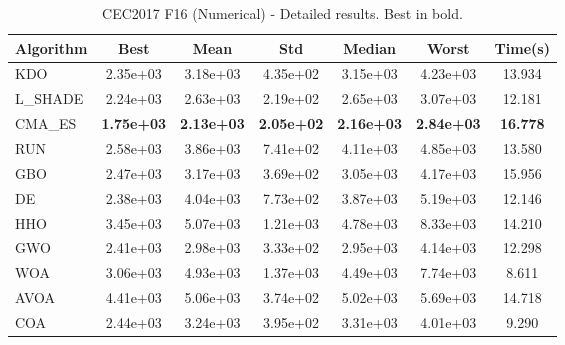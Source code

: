 \begin{table}[H]
\centering\small
\caption{CEC2017 F16 (Numerical) - Detailed results. Best in bold.}
\label{tab:cec2017_F16}
\begin{tabular}{lcccccc}
\toprule
\textbf{Algorithm} & \textbf{Best} & \textbf{Mean} & \textbf{Std} & \textbf{Median} & \textbf{Worst} & \textbf{Time(s)} \\
\midrule
KDO & 2.35e+03 & 3.18e+03 & 4.35e+02 & 3.15e+03 & 4.23e+03 & 13.934 \\
L_SHADE & 2.24e+03 & 2.63e+03 & 2.19e+02 & 2.65e+03 & 3.07e+03 & 12.181 \\
CMA_ES & \textbf{1.75e+03} & \textbf{2.13e+03} & \textbf{2.05e+02} & \textbf{2.16e+03} & \textbf{2.84e+03} & \textbf{16.778} \\
RUN & 2.58e+03 & 3.86e+03 & 7.41e+02 & 4.11e+03 & 4.85e+03 & 13.580 \\
GBO & 2.47e+03 & 3.17e+03 & 3.69e+02 & 3.05e+03 & 4.17e+03 & 15.956 \\
DE & 2.38e+03 & 4.04e+03 & 7.73e+02 & 3.87e+03 & 5.19e+03 & 12.146 \\
HHO & 3.45e+03 & 5.07e+03 & 1.21e+03 & 4.78e+03 & 8.33e+03 & 14.210 \\
GWO & 2.41e+03 & 2.98e+03 & 3.33e+02 & 2.95e+03 & 4.14e+03 & 12.298 \\
WOA & 3.06e+03 & 4.93e+03 & 1.37e+03 & 4.49e+03 & 7.74e+03 & 8.611 \\
AVOA & 4.41e+03 & 5.06e+03 & 3.74e+02 & 5.02e+03 & 5.69e+03 & 14.718 \\
COA & 2.44e+03 & 3.24e+03 & 3.95e+02 & 3.31e+03 & 4.01e+03 & 9.290 \\
\bottomrule
\end{tabular}
\end{table}
